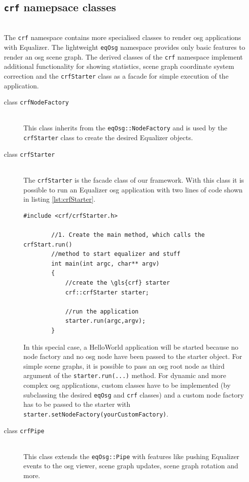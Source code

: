 \subsection{\textbf{\texttt{crf}} namepsace classes}
\hfill\\
The \texttt{crf} namespace contains more specialised classes to render \gls{osg} applications with Equalizer. The lightweight  \texttt{eqOsg} namespace provides only basic features to render an \gls{osg} scene graph. The derived classes of the \texttt{crf} namespace implement additional functionality for showing statistics, scene graph coordinate system correction and the \texttt{crfStarter} class as a facade for simple execution of the application.
\begin{description}
	\item[class \texttt{crfNodeFactory}]\hfill\\
		This class inherits from the \texttt{eqOsg::NodeFactory} and is used by the \texttt{crfStarter} class to create the desired Equalizer objects.
	\item[class \texttt{crfStarter}]\hfill\\
		The \texttt{crfStarter} is the facade class of our framework. With this class it is possible to run an Equalizer \gls{osg} application with two lines of code shown in listing \ref{lst:crfStarter}.
		
		\begin{lstlisting}[caption={\texttt{crfStarter} main method},label={lst:crfStarter}]
		#include <crf/crfStarter.h>

		//1. Create the main method, which calls the crfStart.run() 
		//method to start equalizer and stuff
		int main(int argc, char** argv) 
		{
		    //create the \gls{crf} starter
			crf::crfStarter starter;

			//run the application
			starter.run(argc,argv);
		}
		\end{lstlisting}

		In this special case, a HelloWorld application will be started because no node factory and no \gls{osg} node have been passed to the starter object. For simple scene graphs, it is possible to pass an \gls{osg} root node as third argument of the \texttt{starter.run(...)} method. For dynamic and more complex \gls{osg} applications, custom classes have to be implemented (by subclassing the desired \texttt{eqOsg} and \texttt{crf} classes) and a custom node factory has to be passed to the starter with \texttt{starter.setNodeFactory(yourCustomFactory)}.
	\item[class \texttt{crfPipe}]\hfill\\
		This class extends the \texttt{eqOsg::Pipe} with features like pushing Equalizer events to the \gls{osg} viewer, scene graph updates, scene graph rotation and more. 
\end{description}

